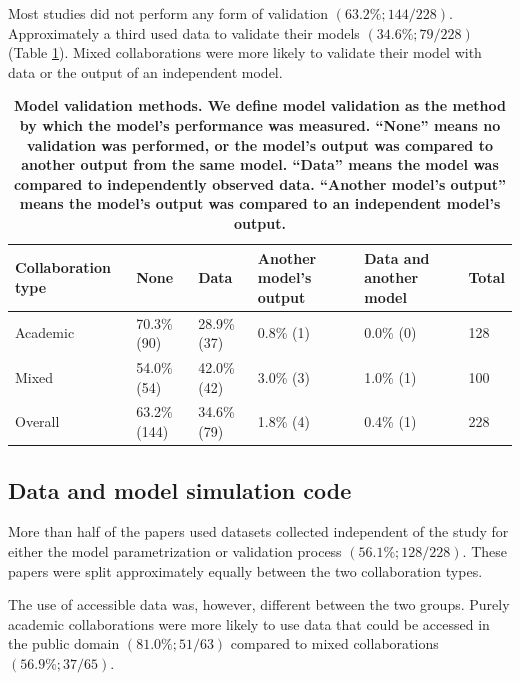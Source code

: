 \documentclass[10pt,letterpaper]{article}
\begin{document}
Most studies did not perform any form of validation $(63.2\%; 144/228)$. Approximately a third used data to validate their models $(34.6\%; 79/228)$ (Table \ref{model_validation_results}). Mixed collaborations were more likely to validate their model with data or the output of an independent model. 

\begin{table}[!h]
	\centering
	\setlength\arrayrulewidth{1pt} 
	\caption{\bf Model validation methods. We define model validation as the method by which the model's performance was measured. ``None'' means no validation was performed, or the model’s output was compared to another output from the same model. ``Data'' means the model was compared to independently observed data. ``Another model’s output'' means the model's output was compared to an independent model's output.}
	\begin{adjustwidth}{-0.00in}{0in}
		\begin{tabular}{| p{}  p{} p{} p{} p{} p{}|}
			\hline
			\textbf{Collaboration type} & \textbf{None} & \textbf{Data} & \textbf{Another model's output} & \textbf{Data and another model} & \textbf{Total} \\ \hline
			Academic & 70.3\% (90) & 28.9\% (37) & 0.8\% (1) & 0.0\% (0) & 128 \\ \hline
			Mixed & 54.0\% (54) & 42.0\% (42) & 3.0\% (3) & 1.0\% (1) & 100 \\ \hline \rowcolor{gray!20}
			Overall & 63.2\% (144) & 34.6\% (79) & 1.8\% (4) & 0.4\% (1) & 228\\ \hline
		\end{tabular}
	\end{adjustwidth}
	\label{model_validation_results}
\end{table}


\subsection*{Data and model simulation code}
More than half of the papers used datasets collected independent of the study for either the model parametrization or validation process $(56.1\%; 128/228)$. These papers were split approximately equally between the two collaboration types. 

The use of accessible data was, however, different between the two groups. Purely academic collaborations were more likely to use data that could be accessed in the public domain $(81.0\%; 51/63)$ compared to mixed collaborations $(56.9\%; 37/65)$.  
\end{document}
